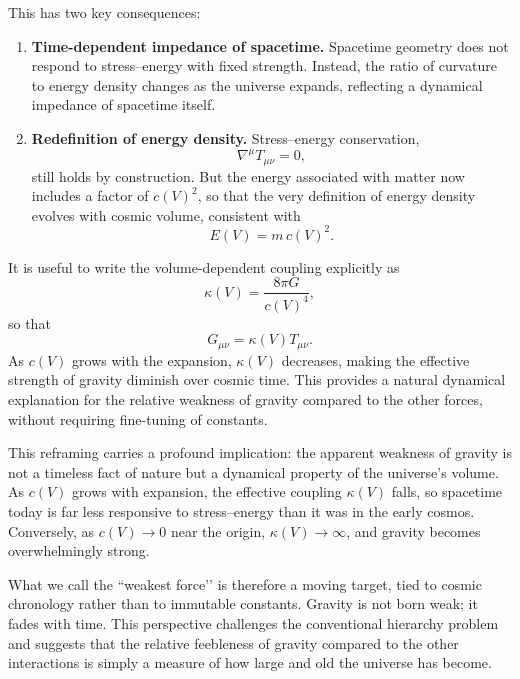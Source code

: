 \documentclass[12pt]{article}
\begin{document}
This has two key consequences:

\begin{enumerate}
  \item \textbf{Time-dependent impedance of spacetime.} Spacetime geometry does not respond to stress–energy with fixed strength. Instead, the ratio of curvature to energy density changes as the universe expands, reflecting a dynamical impedance of spacetime itself.
  \item \textbf{Redefinition of energy density.} Stress–energy conservation,
  \begin{equation}
    \nabla^\mu T_{\mu\nu} = 0,
  \end{equation}
  still holds by construction. But the energy associated with matter now includes a factor of $c(V)^2$, so that the very definition of energy density evolves with cosmic volume, consistent with
  \begin{equation}
    E(V) = m\,c(V)^2.
  \end{equation}
\end{enumerate}

It is useful to write the volume-dependent coupling explicitly as
\begin{equation}
  \kappa(V) = \frac{8 \pi G}{c(V)^4},
\end{equation}
so that
\begin{equation}
  G_{\mu\nu} = \kappa(V) T_{\mu\nu}.
\end{equation}
As $c(V)$ grows with the expansion, $\kappa(V)$ decreases, making the effective strength of gravity diminish over cosmic time. This provides a natural dynamical explanation for the relative weakness of gravity compared to the other forces, without requiring fine-tuning of constants.

\bigskip

This reframing carries a profound implication: the apparent weakness of gravity is not a timeless fact of nature but a dynamical property of the universe’s volume. As $c(V)$ grows with expansion, the effective coupling $\kappa(V)$ falls, so spacetime today is far less responsive to stress–energy than it was in the early cosmos. Conversely, as $c(V)\to 0$ near the origin, $\kappa(V)\to\infty$, and gravity becomes overwhelmingly strong. 

What we call the ``weakest force’’ is therefore a moving target, tied to cosmic chronology rather than to immutable constants. Gravity is not born weak; it fades with time. This perspective challenges the conventional hierarchy problem and suggests that the relative feebleness of gravity compared to the other interactions is simply a measure of how large and old the universe has become.
\end{document}
